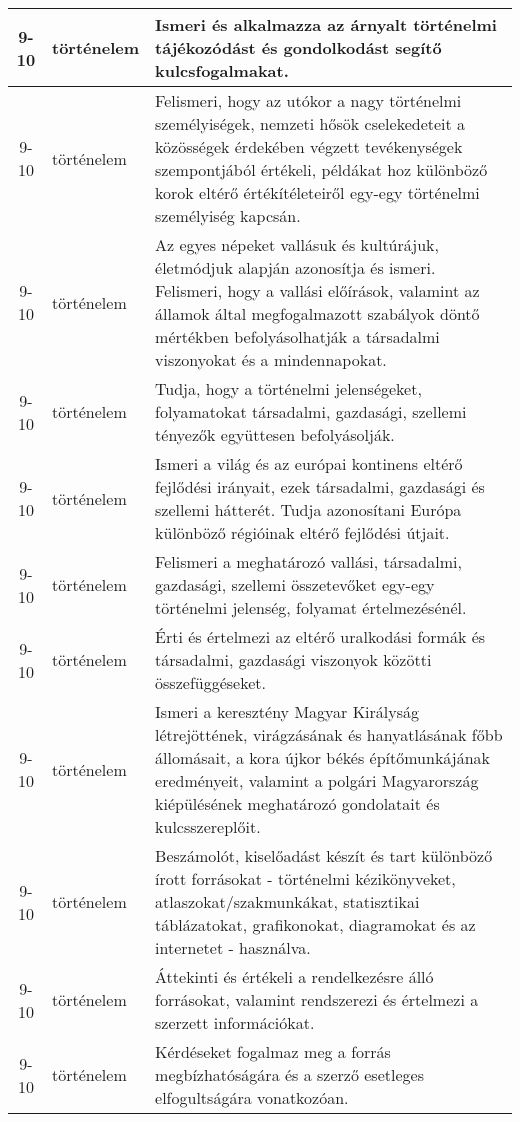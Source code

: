 \begin{small}
\begin{longtable}{c | p{2cm} |  p{11cm} }
              9-10 & történelem & Ismeri és alkalmazza az árnyalt történelmi tájékozódást és gondolkodást segítő kulcsfogalmakat. \\ \hline
              9-10 & történelem & Felismeri, hogy az utókor a nagy történelmi személyiségek, nemzeti hősök cselekedeteit a közösségek érdekében végzett tevékenységek szempontjából értékeli, példákat hoz különböző korok eltérő értékítéleteiről egy-egy történelmi személyiség kapcsán. \\ \hline
              9-10 & történelem & Az egyes népeket vallásuk és kultúrájuk, életmódjuk alapján azonosítja és ismeri. Felismeri, hogy a vallási előírások, valamint az államok által megfogalmazott szabályok döntő mértékben befolyásolhatják a társadalmi viszonyokat és a mindennapokat. \\ \hline
              9-10 & történelem & Tudja, hogy a történelmi jelenségeket, folyamatokat társadalmi, gazdasági, szellemi tényezők együttesen befolyásolják. \\ \hline
              9-10 & történelem & Ismeri a világ és az európai kontinens eltérő fejlődési irányait, ezek társadalmi, gazdasági és szellemi hátterét. Tudja azonosítani Európa különböző régióinak eltérő fejlődési útjait. \\ \hline
              9-10 & történelem & Felismeri a meghatározó vallási, társadalmi, gazdasági, szellemi összetevőket egy-egy történelmi jelenség, folyamat értelmezésénél. \\ \hline
              9-10 & történelem & Érti és értelmezi az eltérő uralkodási formák és társadalmi, gazdasági viszonyok közötti összefüggéseket. \\ \hline
              9-10 & történelem & Ismeri a keresztény Magyar Királyság létrejöttének, virágzásának és hanyatlásának főbb állomásait, a kora újkor békés építőmunkájának eredményeit, valamint a polgári Magyarország kiépülésének meghatározó gondolatait és kulcsszereplőit. \\ \hline
              9-10 & történelem & Beszámolót, kiselőadást készít és tart különböző írott forrásokat - történelmi kézikönyveket, atlaszokat/szakmunkákat, statisztikai táblázatokat, grafikonokat, diagramokat és az internetet - használva. \\ \hline
              9-10 & történelem & Áttekinti és értékeli a rendelkezésre álló forrásokat, valamint rendszerezi és értelmezi a szerzett információkat. \\ \hline
              9-10 & történelem & Kérdéseket fogalmaz meg a forrás megbízhatóságára és a szerző esetleges elfogultságára vonatkozóan. \\ \hline

\end{longtable}
\end{small}
